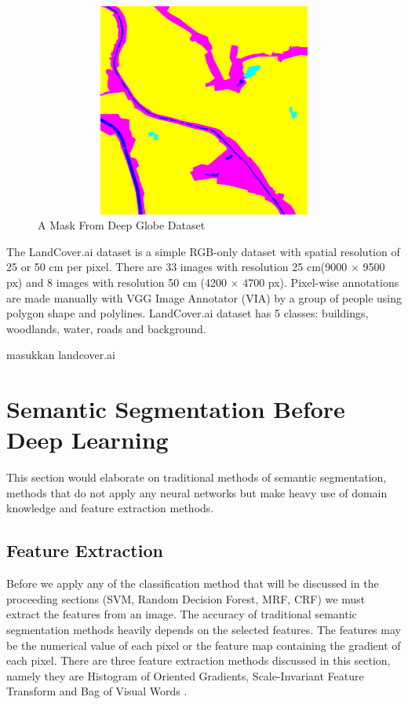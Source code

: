 \begin{figure}[ht]
\includegraphics[width=11.5cm, height=7cm]{images/deepglobe_mask.png}
\centering
\caption{A Mask From Deep Globe Dataset}
\label{fig:deep-globe-mask}
\end{figure}
\FloatBarrier


The LandCover.ai dataset is a  simple RGB-only dataset with spatial resolution of 25 or 50 cm per pixel. There are 33 images with resolution 25 cm(9000 × 9500 px) and 8 images with resolution 50 cm (4200 × 4700 px). Pixel-wise annotations are made manually with VGG Image Annotator (VIA) by a group of people using polygon shape and polylines. LandCover.ai dataset has 5 classes: buildings, woodlands, water, roads and background.

masukkan landcover.ai


\section{Semantic Segmentation Before Deep Learning}

This section would elaborate on traditional methods of semantic segmentation, methods that do not apply any neural networks but make heavy use of domain knowledge and feature extraction methods. 

\subsection{Feature Extraction}
Before we apply any of the classification method that will be discussed in the proceeding sections (SVM, Random Decision Forest, MRF, CRF) we must extract the features from an image. The accuracy of traditional semantic segmentation methods heavily depends on the selected features. The features may be the numerical value of each pixel or the feature map containing the gradient of each pixel. There are three feature extraction methods discussed in this section, namely they are Histogram of Oriented Gradients, Scale-Invariant Feature Transform and Bag of Visual Words .

